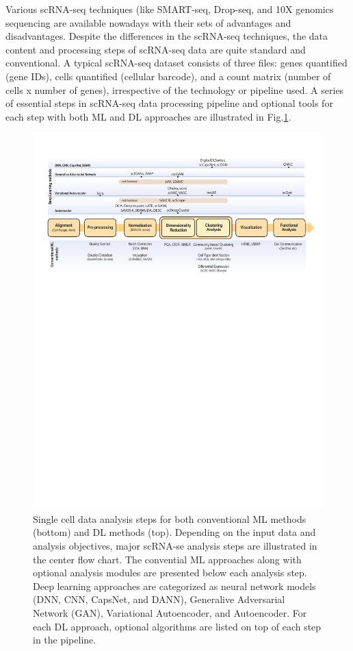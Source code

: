 \documentclass[
]{book}
\begin{document}
Various scRNA-seq techniques (like SMART-seq, Drop-seq, and 10X genomics sequencing \citep{RN81, RN97} are available nowadays with their sets of advantages and disadvantages. Despite the differences in the scRNA-seq techniques, the data content and processing steps of scRNA-seq data are quite standard and conventional. A typical scRNA-seq dataset consists of three files: genes quantified (gene IDs), cells quantified (cellular barcode), and a count matrix (number of cells x number of genes), irrespective of the technology or pipeline used. A series of essential steps in scRNA-seq data processing pipeline and optional tools for each step with both ML and DL approaches are illustrated in Fig.\ref{fig:Figure1}.

\begin{figure}

{\centering \includegraphics[width=22.31in]{Figures/Figure1} 

}

\caption{Single cell data analysis steps for both conventional ML methods (bottom) and DL methods (top). Depending on the input data and analysis objectives, major scRNA-se analysis steps are illustrated in the center flow chart. The convential ML approaches along with optional analysis modules are presented below each analysis step. Deep learning approaches are categorized as neural network models (DNN, CNN, CapsNet, and DANN), Generalive Adversarial Network (GAN), Variational Autoencoder, and Autoencoder. For each DL approach, optional algorithms are listed on top of each step in the pipeline.}\label{fig:Figure1}
\end{figure}
\end{document}
